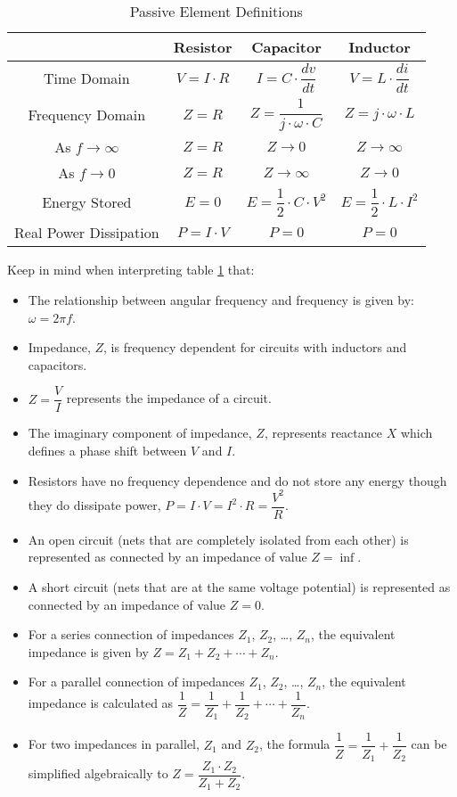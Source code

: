 \documentclass[main.tex]{subfiles}
\begin{document}
\begin{table}[H]
    \centering
    \begin{tabular}{|c|c|c|c|}
        \hline
        & Resistor & Capacitor & Inductor \\ \hline
        Time Domain & $V = I \cdot R$ & $I = C \cdot \dfrac{dv}{dt}$ & $V = L \cdot \dfrac{di}{dt}$ \\ \hline
        Frequency Domain & $Z = R$ & $Z = \dfrac{1}{j \cdot \omega \cdot C}$ & $Z = j \cdot \omega \cdot L$ \\ \hline
        As $f \to \infty$ & $Z = R$ & $Z \to 0$ & $Z \to \infty$ \\ \hline
        As $f \to 0$ & $Z = R$ & $Z \to \infty$ & $Z \to 0$ \\ \hline
        Energy Stored & $E = 0$ & $E = \dfrac{1}{2} \cdot C \cdot V^{2}$ & $E = \dfrac{1}{2} \cdot L \cdot I^{2}$ \\ \hline
        Real Power Dissipation & $P = I \cdot V$ & $P = 0$ & $P = 0$ \\ \hline
    \end{tabular}
    \caption{Passive Element Definitions}
    \label{tab:passive_definitions}
\end{table}

\noindent Keep in mind when interpreting table \ref{tab:passive_definitions} that:
\begin{itemize}
    \item The relationship between angular frequency and frequency is given by: $\omega = 2 \pi f$.
    \item Impedance, $Z$, is frequency dependent for circuits with inductors and capacitors.
    \item $Z = \dfrac{V}{I}$ represents the impedance of a circuit. 
    \item The imaginary component of impedance, $Z$, represents reactance $X$ which defines a phase shift between $V$ and $I$.
    \item Resistors have no frequency dependence and do not store any energy though they do dissipate power, $P = I \cdot V = I^{2} \cdot R = \dfrac{V^2}{R}$.
    \item An open circuit (nets that are completely isolated from each other) is represented as connected by an impedance of value $Z = \inf$.
    \item A short circuit (nets that are at the same voltage potential) is represented as connected by an impedance of value $Z = 0$. 
    \item For a series connection of impedances $Z_1$, $Z_2$, \dots, $Z_n$, the equivalent impedance is given by $Z = Z_1 + Z_2 + \cdots + Z_n$.
    \item For a parallel connection of impedances $Z_1$, $Z_2$, \dots, $Z_n$, the equivalent impedance is calculated as $\dfrac{1}{Z} = \dfrac{1}{Z_1} + \dfrac{1}{Z_2} + \cdots + \dfrac{1}{Z_n}$.
    \item For two impedances in parallel, $Z_1$ and $Z_2$, the formula $\dfrac{1}{Z} = \dfrac{1}{Z_1} + \dfrac{1}{Z_2}$ can be simplified algebraically to $Z = \dfrac{Z_1 \cdot Z_2}{Z_1 + Z_2}$. 
\end{itemize}
\end{document}
